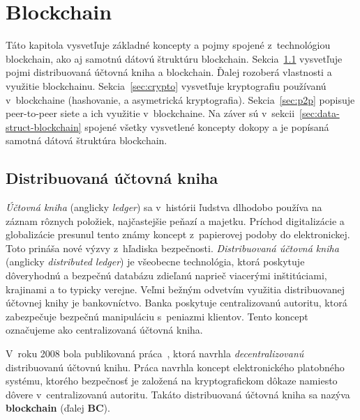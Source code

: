 \chapter{Blockchain}\label{chap:blockchain}

Táto kapitola vysvetľuje základné koncepty a pojmy spojené z~technológiou blockchain, ako aj samotnú dátovú štruktúru blockchain. Sekcia~\ref{sec:ladger} vysvetľuje pojmi distribuovaná účtovná kniha a blockchain. Ďalej rozoberá vlastnosti a využitie blockchainu. Sekcia~\ref{sec:crypto} vysvetľuje kryptografiu používanú v~blockchaine (hashovanie, a asymetrická kryptografia). Sekcia~\ref{sec:p2p} popisuje peer-to-peer siete a ich využitie v~blockchaine. Na záver sú v~sekcii~\ref{sec:data-struct-blockchain} spojené všetky vysvetlené koncepty dokopy a je popísaná samotná dátová štruktúra blockchain.

\section{Distribuovaná účtovná kniha}\label{sec:ladger}
\textit{Účtovná kniha} (anglicky \textit{ledger}) sa v~histórii ľudstva dlhodobo používa na záznam rôznych položiek, najčastejšie peňazí a majetku. Príchod digitalizácie a globalizácie presunul tento známy koncept z~papierovej podoby do elektronickej. Toto prináša nové výzvy z~hľadiska bezpečnosti.
\textit{Distribuovaná účtovná kniha} (anglicky \textit{distributed ledger}) je všeobecne technológia, ktorá poskytuje dôveryhodnú a bezpečnú databázu zdieľanú naprieč viacerými inštitúciami, krajinami a to typicky verejne. Veľmi bežným odvetvím využitia distribuovanej účtovnej knihy je bankovníctvo. Banka poskytuje centralizovanú autoritu, ktorá zabezpečuje bezpečnú manipuláciu s~peniazmi klientov. Tento koncept označujeme ako centralizovaná účtovná kniha.~\cite{dltUkReport}

V~roku 2008 bola publikovaná práca~\cite{satoshiBitcoin}, ktorá navrhla \textit{decentralizovanú} distribuovanú účtovnú knihu. Práca navrhla koncept elektronického platobného systému, ktorého bezpečnosť je založená na kryptografickom dôkaze namiesto dôvere v~centralizovanú autoritu. Takáto distribuovaná účtovná kniha sa nazýva \textbf{blockchain} (ďalej \textbf{BC}).

